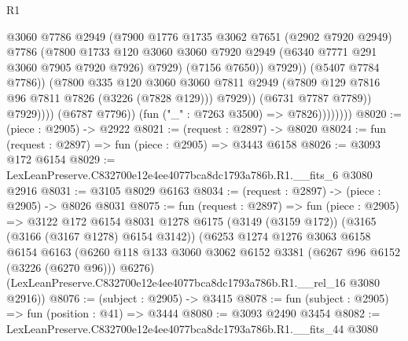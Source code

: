 \begin{lexlean}{R1}
\begin{coremodule}
                                      @3060
                                      @7786
                                      @2949
                                      (@7900
                                        @1776
                                        @1735
                                        @3062
                                        @7651
                                        (@2902 @7920 @2949)
                                        @7786
                                        (@7800
                                          @1733
                                          @120
                                          @3060
                                          @3060
                                          @7920
                                          @2949
                                          (@6340 @7771 @291 @3060 @7905 @7920 @7926)
                                          @7929)
                                        (@7156 @7650))
                                      @7929))
                                  (@5407 @7784 @7786))
                                (@7800
                                  @335
                                  @120
                                  @3060
                                  @3060
                                  @7811
                                  @2949
                                  (@7809 @129 @7816 @96 @7811 @7826 (@3226 (@7828 @129)))
                                  @7929))
                              (@6731 @7787 @7789))
                            @7929))))
                    (@6787 @7796))
                  (fun ("_" : @7263 @3500) => @7826))))))))
@8020 := (piece : @2905) -> @2922
@8021 := (request : @2897) -> @8020
@8024 := fun (request : @2897) => fun (piece : @2905) => @3443 @6158
@8026 := @3093 @172 @6154
@8029 := LexLeanPreserve.C832700e12e4ee4077bca8dc1793a786b.R1.__fits_6 @3080 @2916
@8031 := @3105 @8029 @6163
@8034 := (request : @2897) -> (piece : @2905) -> @8026 @8031
@8075 := fun (request : @2897) =>
  fun (piece : @2905) =>
  @3122
    @172
    @6154
    @8031
    @1278
    @6175
    (@3149 (@3159 @172))
    (@3165 (@3166 (@3167 @1278) @6154 @3142))
    (@6253
      @1274
      @1276
      @3063
      @6158
      @6154
      @6163
      (@6260 @118 @133 @3060 @3062 @6152 @3381 (@6267 @96 @6152 (@3226 (@6270 @96))) @6276)
      (LexLeanPreserve.C832700e12e4ee4077bca8dc1793a786b.R1.__rel_16 @3080 @2916))
@8076 := (subject : @2905) -> @3415
@8078 := fun (subject : @2905) => fun (position : @41) => @3444
@8080 := @3093 @2490 @3454
@8082 := LexLeanPreserve.C832700e12e4ee4077bca8dc1793a786b.R1.__fits_44 @3080

\end{coremodule}
\end{lexlean}
